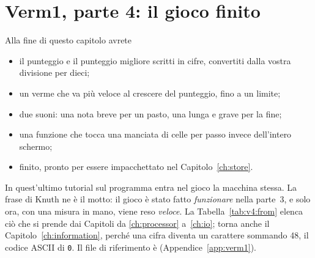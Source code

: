 \chapter{Verm1, parte 4: il gioco finito}
\label{ch:verm1p4}


\begin{chapgoals}
Alla fine di questo capitolo avrete
\begin{itemize}
\item il punteggio e il punteggio migliore scritti in cifre, convertiti dalla vostra divisione per dieci;
\item un verme che va più veloce al crescere del punteggio, fino a un limite;
\item due suoni: una nota breve per un pasto, una lunga e grave per la fine;
\item una funzione  che tocca una manciata di celle per passo invece dell'intero schermo;
\item \vermone finito, pronto per essere impacchettato nel Capitolo~\ref{ch:store}.
\end{itemize}
\end{chapgoals}


In quest'ultimo tutorial sul programma entra nel gioco la macchina stessa. La
frase di Knuth ne è il motto: il gioco è stato fatto \emph{funzionare} nella
parte~3, e solo ora, con una misura in mano, viene reso \emph{veloce}. La
Tabella~\ref{tab:v4:from} elenca ciò che si prende dai Capitoli da
\ref{ch:processor} a~\ref{ch:io}; torna anche il
Capitolo~\ref{ch:information}, perché una cifra diventa un carattere sommando
48, il codice ASCII di \texttt{0}. Il file di riferimento è
 (Appendice~\ref{app:verm1}).

